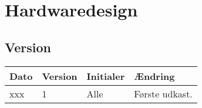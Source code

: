 \chapter{Hardwaredesign}
\section*{Version}
\begin{table}[h]
	\centering
	\begin{tabularx}{\textwidth - 2cm}{|l|l|l|X|}
	\hline
	Dato			& Version			& Initialer 		& Ændring										\\ \hline
	xxx 			& 1 				& Alle				& Første udkast. 								\\ \hline
	\end{tabularx}
\end{table}
\clearpage

